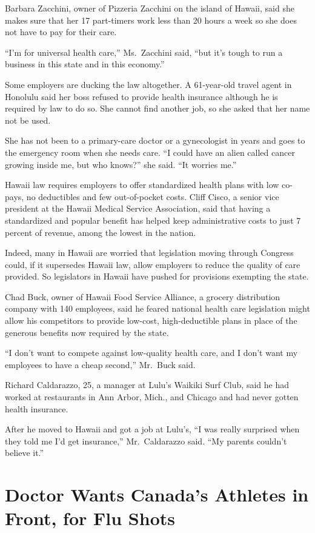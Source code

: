 ﻿\documentclass[12pt]{article}
\begin{document}
Barbara Zacchini, owner of Pizzeria Zacchini on the island of Hawaii, said she makes sure that her
17 part-timers work less than 20 hours a week so she does not have to pay for their care.

``I'm for universal health care,'' Ms.~Zacchini said, ``but it's tough to run a business in this
state and in this economy.''

Some employers are ducking the law altogether. A 61-year-old travel agent in Honolulu said her boss
refused to provide health insurance although he is required by law to do so. She cannot find another
job, so she asked that her name not be used.

She has not been to a primary-care doctor or a gynecologist in years and goes to the emergency room
when she needs care. ``I could have an alien called cancer growing inside me, but who knows?'' she
said. ``It worries me.''

Hawaii law requires employers to offer standardized health plans with low co-pays, no deductibles
and few out-of-pocket costs. Cliff Cisco, a senior vice president at the Hawaii Medical Service
Association, said that having a standardized and popular benefit has helped keep administrative
costs to just 7 percent of revenue, among the lowest in the nation.

Indeed, many in Hawaii are worried that legislation moving through Congress could, if it supersedes
Hawaii law, allow employers to reduce the quality of care provided. So legislators in Hawaii have
pushed for provisions exempting the state.

Chad Buck, owner of Hawaii Food Service Alliance, a grocery distribution company with 140 employees,
said he feared national health care legislation might allow his competitors to provide low-cost,
high-deductible plans in place of the generous benefits now required by the state.

``I don't want to compete against low-quality health care, and I don't want my employees to have a
cheap second,'' Mr.~Buck said.

Richard Caldarazzo, 25, a manager at Lulu's Waikiki Surf Club, said he had worked at restaurants in
Ann Arbor, Mich., and Chicago and had never gotten health insurance.

After he moved to Hawaii and got a job at Lulu's, ``I was really surprised when they told me I'd get
insurance,'' Mr.~Caldarazzo said. ``My parents couldn't believe it.''

\section{Doctor Wants Canada's Athletes in Front, for Flu Shots}
\end{document}

